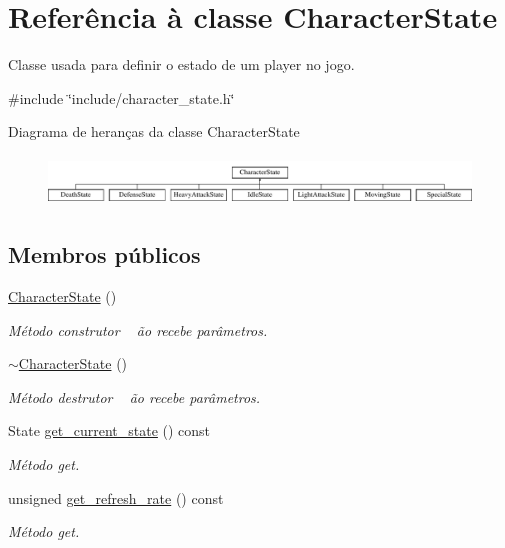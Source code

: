 \hypertarget{classCharacterState}{}\section{Referência à classe Character\+State}
\label{classCharacterState}


Classe usada para definir o estado de um player no jogo.  




{\ttfamily \#include \char`\"{}include/character\+\_\+state.\+h\char`\"{}}

Diagrama de heranças da classe Character\+State\begin{figure}[H]
\begin{center}
\leavevmode
\includegraphics[height=1.333333cm]{classCharacterState}
\end{center}
\end{figure}
\subsection*{Membros públicos}
\begin{DoxyCompactItemize}
\item 
\mbox{\label{classCharacterState_abe9bcd871b173ad3312d71e3165b1bfb}} 
\mbox{\hyperlink{classCharacterState_abe9bcd871b173ad3312d71e3165b1bfb}{Character\+State}} ()
\begin{DoxyCompactList}\small\item\em Método construtor ~\newline
ão recebe parâmetros. \end{DoxyCompactList}\item 
\mbox{\label{classCharacterState_a690e946cdc5647403c79fbcc543aafc9}} 
\mbox{\hyperlink{classCharacterState_a690e946cdc5647403c79fbcc543aafc9}{$\sim$\+Character\+State}} ()
\begin{DoxyCompactList}\small\item\em Método destrutor ~\newline
ão recebe parâmetros. \end{DoxyCompactList}\item 
State \mbox{\hyperlink{classCharacterState_a8abbdb5d82447c225dc54f205c782e8e}{get\+\_\+current\+\_\+state}} () const
\begin{DoxyCompactList}\small\item\em Método get. \end{DoxyCompactList}\item 
unsigned \mbox{\hyperlink{classCharacterState_a26ad231cccb89de9c1ed224cf126ca38}{get\+\_\+refresh\+\_\+rate}} () const
\begin{DoxyCompactList}\small\item\em Método get. \end{DoxyCompactList}\end{DoxyCompactItemize}
